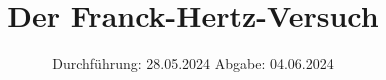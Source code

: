 

\subject{V601}
\title{Der Franck-Hertz-Versuch}
\date{%
  Durchführung: 28.05.2024
  \hspace{3em}
  Abgabe: 04.06.2024
}



\maketitle
\thispagestyle{empty}
\tableofcontents
\newpage






\printbibliography{}
\appendix
\setcounter{secnumdepth}{0}


